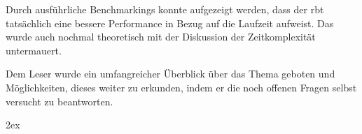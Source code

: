 \documentclass[11pt]{article}
\begin{document}
Durch ausführliche Benchmarkings konnte aufgezeigt werden, dass der \gls{rbt} tatsächlich eine bessere Performance in Bezug auf die Laufzeit aufweist.
Das wurde auch nochmal theoretisch mit der Diskussion der Zeitkomplexität untermauert. 

Dem Leser wurde ein umfangreicher Überblick über das Thema geboten und Möglichkeiten, dieses weiter zu erkunden, 
indem er die noch offenen Fragen selbst versucht zu beantworten. 

\pagebreak
\begingroup
\parindent 0pt
\parskip 2ex
\def\enotesize{\normalsize}
\theendnotes
\endgroup

\pagebreak

\end{document}
